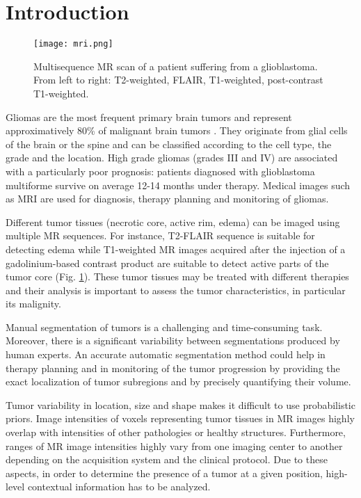 \documentclass[preprint,12pt]{elsarticle}
\begin{document}
\section{Introduction}
\begin{figure}[!]
\centering
\texttt{[image: mri.png]}
\caption{Multisequence MR scan of a patient suffering from a glioblastoma. From left to right: T2-weighted, FLAIR, T1-weighted, post-contrast T1-weighted.}\label{fig_mri}
\end{figure} 

Gliomas are the most frequent primary brain tumors and represent approximatively 80\% of malignant brain tumors \cite{goodenberger2012genetics}. They originate from glial cells of the brain or the spine and can be classified according to the cell type, the grade and the location. High grade gliomas (grades III and IV) are associated with a particularly poor prognosis: patients diagnosed with glioblastoma multiforme survive on average 12-14 months under therapy. Medical images such as MRI \cite{bauer2013survey} are used for diagnosis, therapy planning and monitoring of gliomas.



Different tumor tissues (necrotic core, active rim, edema) can be imaged using multiple MR sequences. For instance, T2-FLAIR sequence is suitable for detecting edema while T1-weighted MR images acquired after the injection of a gadolinium-based contrast product are suitable to detect active parts of the tumor core (Fig. \ref{fig_mri}). These tumor tissues may be treated with different therapies \cite{gillies2015radiomics} and their analysis is important to assess the tumor characteristics, in particular its malignity.

Manual segmentation of tumors is a challenging and time-consuming task. Moreover, there is a significant variability between segmentations produced by human experts. An accurate automatic segmentation method could help in therapy planning and in monitoring of the tumor progression by providing the exact localization of tumor subregions and by precisely quantifying their volume.


Tumor variability in location, size and shape makes it difficult to use probabilistic priors. Image intensities of voxels representing tumor tissues in MR images highly overlap with intensities of other pathologies or healthy structures. Furthermore, ranges of MR image intensities highly vary from one imaging center to another depending on the acquisition system and the clinical protocol. Due to these aspects, in order to determine the presence of a tumor at a given position, high-level contextual information has to be analyzed.
\end{document}
